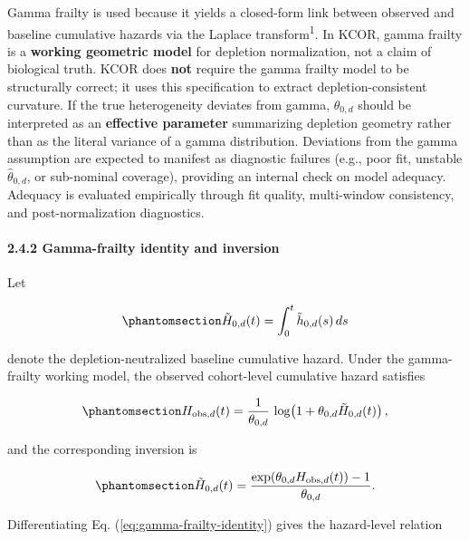 \documentclass[
]{article}
\begin{document}
Gamma frailty is used because it yields a closed-form link between
observed and baseline cumulative hazards via the Laplace
transform\textsuperscript{1}. In KCOR, gamma frailty is a
\textbf{working geometric model} for depletion normalization, not a
claim of biological truth. KCOR does \textbf{not} require the gamma
frailty model to be structurally correct; it uses this specification to
extract depletion-consistent curvature. If the true heterogeneity
deviates from gamma, \(\theta_{0,d}\) should be interpreted as an
\textbf{effective parameter} summarizing depletion geometry rather than
as the literal variance of a gamma distribution. Deviations from the
gamma assumption are expected to manifest as diagnostic failures (e.g.,
poor fit, unstable \(\hat{\theta}_{0,d}\), or sub-nominal coverage),
providing an internal check on model adequacy. Adequacy is evaluated
empirically through fit quality, multi-window consistency, and
post-normalization diagnostics.

\paragraph{2.4.2 Gamma-frailty identity and
inversion}\label{gamma-frailty-identity-and-inversion}

Let

\begin{equation}\protect\phantomsection\label{eq:baseline-cumhazard}{
\tilde H_{0,d}(t) = \int_0^t \tilde h_{0,d}(s)\,ds
}\end{equation}

denote the depletion-neutralized baseline cumulative hazard. Under the
gamma-frailty working model, the observed cohort-level cumulative hazard
satisfies

\begin{equation}\protect\phantomsection\label{eq:gamma-frailty-identity}{
H_{\mathrm{obs},d}(t) = \frac{1}{\theta_{0,d}}\,\log\!\left(1 + \theta_{0,d} \tilde H_{0,d}(t)\right),
}\end{equation}

and the corresponding inversion is

\begin{equation}\protect\phantomsection\label{eq:gamma-frailty-inversion}{
\tilde H_{0,d}(t) = \frac{\exp\!\left(\theta_{0,d} H_{\mathrm{obs},d}(t)\right) - 1}{\theta_{0,d}}.
}\end{equation}

Differentiating Eq. (\ref{eq:gamma-frailty-identity}) gives the
hazard-level relation
\end{document}
